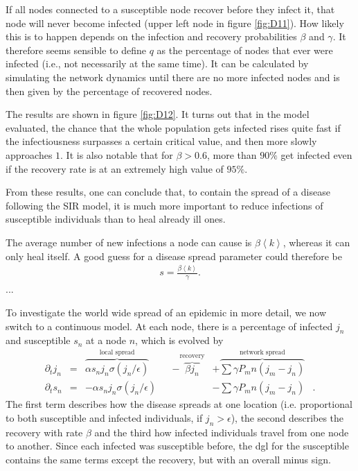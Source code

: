 \documentclass{scrartcl}
\begin{document}
If all nodes connected to a susceptible node recover before they infect it, that node will never become infected (upper left node in figure \ref{fig:D11}). How likely this is to happen depends on the infection and recovery probabilities $\beta$ and $\gamma$. 
It therefore seems sensible to define $q$ as the percentage of nodes that ever were infected (i.e., not necessarily at the same time). 
It can be calculated by simulating the network dynamics until there are no more infected nodes and is then given by the percentage of recovered nodes. 

The results are shown in figure \ref{fig:D12}. 
It turns out that in the model evaluated, the chance that the whole 
population gets infected rises quite fast if the infectiousness surpasses
a certain critical value, and then more slowly approaches $1$. It is also 
notable that for $\beta > 0.6$, more than $90\%$ get infected even if
the recovery rate is at an extremely high value of $95\%$.

From these results, one can conclude that, to contain the spread of a disease following the SIR model, 
it is much more important to reduce infections of susceptible individuals than to heal already ill ones.

The average number of new infections a node can cause is $\beta \left< k \right>$, whereas it can only heal itself. A good guess for a disease spread parameter could therefore be 
\begin{align}
 s = \frac{\beta \left< k\right>}{\gamma}.
\end{align}
...

To investigate the world wide spread of an epidemic in more detail, we now switch to a continuous model. At each node, there is a percentage of infected $j_n$ and susceptible $s_n$ at a node $n$, which is evolved by
\begin{align}
\partial_t j_n &=& \overbrace{\alpha s_n j_n \sigma( j_n / \epsilon)}^{\text{local spread}} &&- \overbrace{\beta j_n}^{\text{recovery}} &+ \overbrace{\sum{\gamma P_mn (j_m - j_n)}}^{\text{network spread}}&\\
\partial_t s_n &=& -\alpha s_n j_n \sigma( j_n / \epsilon)&  &&- \sum{\gamma P_mn (j_m - j_n)}&.
\end{align}
The first term describes how the disease spreads at one location (i.e. proportional to both susceptible and infected individuals, if $j_n > \epsilon$), the second describes the recovery with rate $\beta$ and the third how infected individuals travel from one node to another. Since each infected was susceptible before, the dgl for the susceptible contains the same terms except the recovery, but with an overall minus sign.
\end{document}
